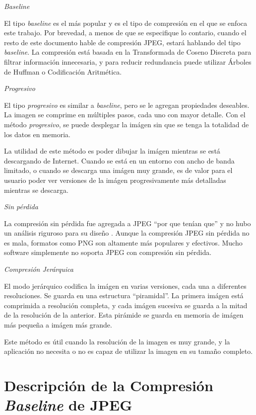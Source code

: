 \begin{list}{}{}
\item \emph{Baseline}

El tipo \emph{baseline} es el más popular y es el tipo de compresión en el que se enfoca este trabajo. Por brevedad, a menos de que se especifique lo contario, cuando el resto de este documento hable de compresión JPEG, estará hablando del tipo \emph{baseline}. La compresión está basada en la Transformada de Coseno Discreta para filtrar información innecesaria, y para reducir redundancia puede utilizar Árboles de Huffman o Codificación Aritmética.

\item \emph{Progresivo}

El tipo \emph{progresivo} es similar a \emph{baseline}, pero se le agregan propiedades deseables. La imagen se comprime en múltiples pasos, cada uno con mayor detalle. Con el método \emph{progresivo}, se puede desplegar la imágen sin que se tenga la totalidad de los datos en memoria.

La utilidad de este método es poder dibujar la imágen mientras se está descargando de Internet. Cuando se está en un entorno con ancho de banda limitado, o cuando se descarga una imágen muy grande, es de valor para el usuario poder ver versiones de la imágen progresivamente más detalladas mientras se descarga.

\item \emph{Sin pérdida}

La compresión sin pérdida fue agregada a JPEG ``por que tenían que'' y no hubo un análisis riguroso para su diseño \citep{JPEGSTD}. Aunque la compresión JPEG sin pérdida no es mala, formatos como PNG son altamente más populares y efectivos. Mucho software simplemente no soporta JPEG con compresión sin pérdida.

\item \emph{Compresión Jerárquica}

El modo jerárquico codifica la imágen en varias versiones, cada una a diferentes resoluciones. Se guarda en una estructura ``piramidal''. La primera imágen está comprimida a resolución completa, y cada imágen sucesiva se guarda a la mitad de la resolución de la anterior. Esta pirámide se guarda en memoria de imágen más pequeña a imágen más grande.

Este método es útil cuando la resolución de la imagen es muy grande, y la aplicación no necesita o no es capaz de utilizar la imagen en su tamaño completo.

\end{list}

\section{Descripción de la Compresión \emph{Baseline} de JPEG}



%
